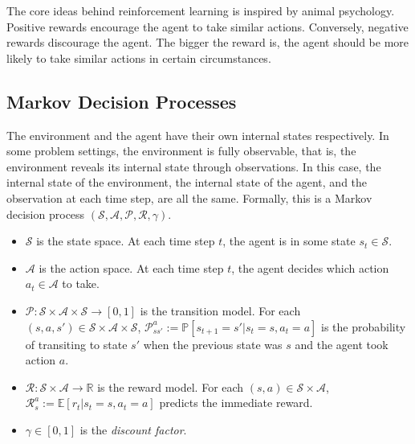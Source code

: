     The core ideas behind reinforcement learning is inspired by animal psychology.
    Positive rewards encourage the agent to take similar actions.
    Conversely, negative rewards discourage the agent.
    The bigger the reward is, the agent should be more likely to take similar actions in certain circumstances.

    \subsection{Markov Decision Processes}

        The environment and the agent have their own internal states respectively.
        In some problem settings, the environment is fully observable,
        that is, the environment reveals its internal state through observations.
        In this case, the internal state of the environment, the internal state of the agent,
        and the observation at each time step, are all the same.
        Formally, this is a Markov decision process $(\mathcal{S}, \mathcal{A}, \mathcal{P}, \mathcal{R}, \gamma)$.

        \begin{itemize}
            \item $\mathcal{S}$ is the state space.
                At each time step $t$, the agent is in some state $s_t \in \mathcal{S}$.
            \item $\mathcal{A}$ is the action space.
                At each time step $t$, the agent decides which action $a_t \in \mathcal{A}$ to take.
            \item $\mathcal{P}: \mathcal{S}\times\mathcal{A}\times\mathcal{S} \rightarrow [0,1]$
                is the transition model.
                For each $(s, a, s') \in \mathcal{S}\times\mathcal{A}\times\mathcal{S}$,
                $\mathcal{P}_{ss'}^a := \mathbb{P}[s_{t+1} = s' | s_t = s, a_t = a]$ is the probability of
                transiting to state $s'$ when the previous state was $s$ and the agent took action $a$.
            \item $\mathcal{R}: \mathcal{S} \times \mathcal{A} \rightarrow \mathbb{R}$ is the reward model.
                For each $(s, a) \in \mathcal{S} \times \mathcal{A}$,
                $\mathcal{R}_s^a := \mathbb{E}[r_{t} | s_t=s, a_t=a]$ predicts the immediate reward.
            \item $\gamma \in [0, 1]$ is the \emph{discount factor}.
        \end{itemize}
        
